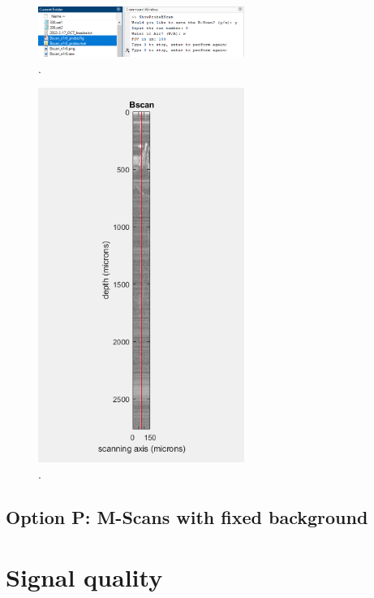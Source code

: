 \documentclass{article}
\begin{document}
\begin{figure}[!h]
	\centering
	\includegraphics[width=0.6\textwidth]{Data for Probe Writeup/ShowProbeBScan operation.png}
	\caption{.}
\end{figure}

\begin{figure}[!h]
	\centering
	\includegraphics[width=0.6\textwidth]{Data for Probe Writeup/BScan fig update.png}
	\caption{.}
\end{figure}

\subsection{Option P: M-Scans with fixed background}

\par{}

\section{Signal quality}
\end{document}
